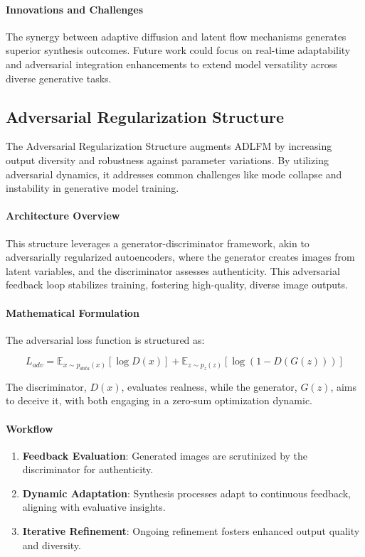 \paragraph{Innovations and Challenges}
The synergy between adaptive diffusion and latent flow mechanisms generates superior synthesis outcomes. Future work could focus on real-time adaptability and adversarial integration enhancements to extend model versatility across diverse generative tasks.

\subsection{Adversarial Regularization Structure}

The Adversarial Regularization Structure augments ADLFM by increasing output diversity and robustness against parameter variations. By utilizing adversarial dynamics, it addresses common challenges like mode collapse and instability in generative model training.

\paragraph{Architecture Overview}
This structure leverages a generator-discriminator framework, akin to adversarially regularized autoencoders, where the generator creates images from latent variables, and the discriminator assesses authenticity. This adversarial feedback loop stabilizes training, fostering high-quality, diverse image outputs.

\paragraph{Mathematical Formulation}
The adversarial loss function is structured as:

\begin{equation}
L_{adv} = \mathbb{E}_{x \sim p_{data}(x)} [\log D(x)] + \mathbb{E}_{z \sim p_{z}(z)} [\log(1 - D(G(z)))]
\end{equation}

The discriminator, \( D(x) \), evaluates realness, while the generator, \( G(z) \), aims to deceive it, with both engaging in a zero-sum optimization dynamic.

\paragraph{Workflow}
\begin{enumerate}
    \item \textbf{Feedback Evaluation}: Generated images are scrutinized by the discriminator for authenticity.
    \item \textbf{Dynamic Adaptation}: Synthesis processes adapt to continuous feedback, aligning with evaluative insights.
    \item \textbf{Iterative Refinement}: Ongoing refinement fosters enhanced output quality and diversity.
\end{enumerate}

